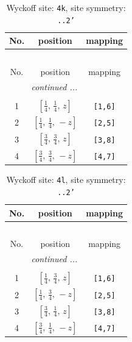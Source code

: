 \documentclass[fleqn,8pt]{jsarticle}
\begin{document}
\renewcommand{\arraystretch}{1.2}
\begin{longtable}{ccc}
\caption{Wyckoff site: {\tt 4k}, site symmetry: {\tt ..2'}}
 \\
 \hline \hline
No. & position & mapping \\ \hline \endfirsthead

\multicolumn{2}{l}{\tablename\ \thetable{}} \\
 \hline \hline
No. & position & mapping \\ \hline \endhead

 \hline \hline
\multicolumn{2}{r}{\footnotesize\it continued ...} \\ \endfoot

 \hline \hline
\multicolumn{2}{r}{} \\ \endlastfoot

1 & $\left[ \frac{1}{4},\, \frac{1}{4},\, z \right]$ & {\tt [1,6]} \\ \hline
2 & $\left[ \frac{1}{4},\, \frac{1}{4},\, - z \right]$ & {\tt [2,5]} \\ \hline
3 & $\left[ \frac{3}{4},\, \frac{3}{4},\, z \right]$ & {\tt [3,8]} \\ \hline
4 & $\left[ \frac{3}{4},\, \frac{3}{4},\, - z \right]$ & {\tt [4,7]} \\
\end{longtable}
\renewcommand{\arraystretch}{1.2}
\begin{longtable}{ccc}
\caption{Wyckoff site: {\tt 4l}, site symmetry: {\tt ..2'}}
 \\
 \hline \hline
No. & position & mapping \\ \hline \endfirsthead

\multicolumn{2}{l}{\tablename\ \thetable{}} \\
 \hline \hline
No. & position & mapping \\ \hline \endhead

 \hline \hline
\multicolumn{2}{r}{\footnotesize\it continued ...} \\ \endfoot

 \hline \hline
\multicolumn{2}{r}{} \\ \endlastfoot

1 & $\left[ \frac{1}{4},\, \frac{3}{4},\, z \right]$ & {\tt [1,6]} \\ \hline
2 & $\left[ \frac{1}{4},\, \frac{3}{4},\, - z \right]$ & {\tt [2,5]} \\ \hline
3 & $\left[ \frac{3}{4},\, \frac{1}{4},\, z \right]$ & {\tt [3,8]} \\ \hline
4 & $\left[ \frac{3}{4},\, \frac{1}{4},\, - z \right]$ & {\tt [4,7]} \\
\end{longtable}
\end{document}
